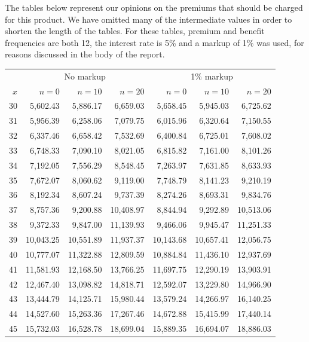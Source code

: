 \documentclass[12pt]{article}
\begin{document}
The tables below represent our opinions on the premiums that should be charged for this product. We have omitted many of the intermediate values in order to shorten the length of the tables. For these tables, premium and benefit frequencies are both 12, the interest rate is 5\% and a markup of 1\% was used, for reasons discussed in the body of the report. 

\begin{table}[ht]
\centering
\begin{tabular}{|r|rrr|rrr|}
  \hline
  & \multicolumn{3}{c}{No markup} & \multicolumn{3}{|c|}{1\% markup} \\ 
$x$ & $n=0$ & $n=10$ & $n=20$ & $n=0$ & $n=10$ & $n=20$ \\
  \hline
30 & 5,602.43 & 5,886.17 & 6,659.03 & 5,658.45 & 5,945.03 & 6,725.62 \\
31 & 5,956.39 & 6,258.06 & 7,079.75 & 6,015.96 & 6,320.64 & 7,150.55 \\
32 & 6,337.46 & 6,658.42 & 7,532.69 & 6,400.84 & 6,725.01 & 7,608.02 \\
33 & 6,748.33 & 7,090.10 & 8,021.05 & 6,815.82 & 7,161.00 & 8,101.26 \\
34 & 7,192.05 & 7,556.29 & 8,548.45 & 7,263.97 & 7,631.85 & 8,633.93 \\
35 & 7,672.07 & 8,060.62 & 9,119.00 & 7,748.79 & 8,141.23 & 9,210.19 \\
36 & 8,192.34 & 8,607.24 & 9,737.39 & 8,274.26 & 8,693.31 & 9,834.76 \\
37 & 8,757.36 & 9,200.88 & 10,408.97 & 8,844.94 & 9,292.89 & 10,513.06 \\
38 & 9,372.33 & 9,847.00 & 11,139.93 & 9,466.06 & 9,945.47 & 11,251.33 \\
39 & 10,043.25 & 10,551.89 & 11,937.37 & 10,143.68 & 10,657.41 & 12,056.75 \\
40 & 10,777.07 & 11,322.88 & 12,809.59 & 10,884.84 & 11,436.10 & 12,937.69 \\
41 & 11,581.93 & 12,168.50 & 13,766.25 & 11,697.75 & 12,290.19 & 13,903.91 \\
42 & 12,467.40 & 13,098.82 & 14,818.71 & 12,592.07 & 13,229.80 & 14,966.90 \\
43 & 13,444.79 & 14,125.71 & 15,980.44 & 13,579.24 & 14,266.97 & 16,140.25 \\
44 & 14,527.60 & 15,263.36 & 17,267.46 & 14,672.88 & 15,415.99 & 17,440.14 \\
45 & 15,732.03 & 16,528.78 & 18,699.04 & 15,889.35 & 16,694.07 & 18,886.03 \\

\end{tabular}
\end{table}
\end{document}
